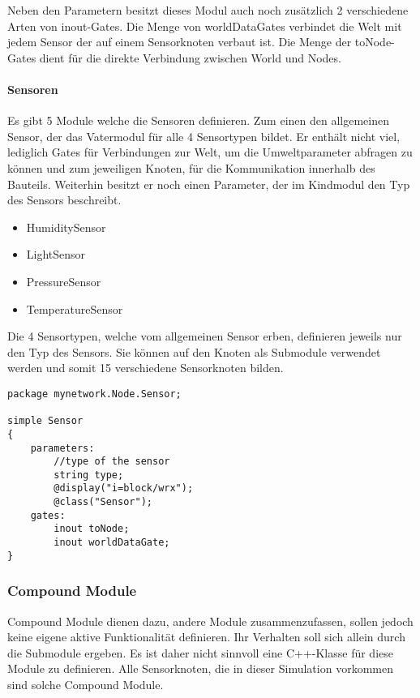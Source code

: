 Neben den Parametern besitzt dieses Modul auch noch zusätzlich 2 verschiedene Arten von inout-Gates. Die Menge von worldDataGates verbindet die Welt mit jedem Sensor der auf einem Sensorknoten verbaut ist. Die Menge der toNode-Gates dient für die direkte Verbindung zwischen World und Nodes.

\paragraph{Sensoren}

Es gibt 5 Module welche die Sensoren definieren. Zum einen den allgemeinen Sensor, der das Vatermodul für alle 4 Sensortypen bildet. Er enthält nicht viel, lediglich Gates für Verbindungen zur Welt, um die Umweltparameter abfragen zu können und zum jeweiligen Knoten, für die Kommunikation innerhalb des Bauteils. Weiterhin besitzt er noch einen Parameter, der im Kindmodul den Typ des Sensors beschreibt.

\begin{multicols}{2}
\begin{itemize}
\item HumiditySensor
\item LightSensor
\item PressureSensor
\item TemperatureSensor
\end{itemize}
\end{multicols}

Die 4 Sensortypen, welche vom allgemeinen Sensor erben, definieren jeweils nur den Typ des Sensors. Sie können auf den Knoten als Submodule verwendet werden und somit 15 verschiedene Sensorknoten bilden.

\begin{minipage}{\textwidth}
\begin{lstlisting}[language=ned,caption={Sensor},label=lst:Sensor]
package mynetwork.Node.Sensor;

simple Sensor 
{
    parameters:
        //type of the sensor
        string type;
	    @display("i=block/wrx");
	    @class("Sensor");
	gates: 
	    inout toNode;
	    inout worldDataGate;
}
\end{lstlisting}
\end{minipage}

\subsubsection{Compound Module}

Compound Module dienen dazu, andere Module zusammenzufassen, sollen jedoch keine eigene aktive Funktionalität definieren. Ihr Verhalten soll sich allein durch die Submodule ergeben. Es ist daher nicht sinnvoll eine C++-Klasse für diese Module zu definieren.\newline
Alle Sensorknoten, die in dieser Simulation vorkommen sind solche Compound Module.

